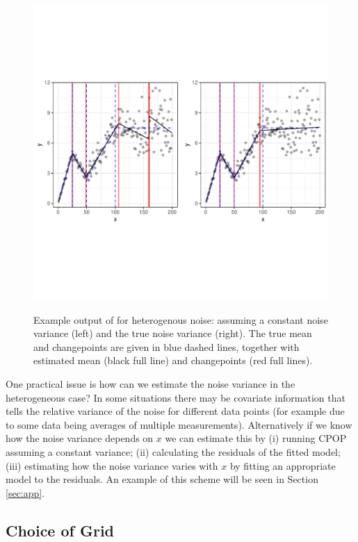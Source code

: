 \documentclass[nojss]{jss}
\begin{document}
\begin{figure}
\centering
{\includegraphics[scale=.5,width=14cm,trim={0 4cm 0 4cm},clip]{figures/cpop_uneven_examples_ggplot.pdf}}
\caption{Example output of  for heterogenous noise: assuming a constant noise variance (left) and the true noise variance (right). The true mean and changepoints are given in blue dashed lines, together with estimated mean (black full line) and changepoints (red full lines). }
\label{fig:cpop-example-heterogeneous}
\end{figure}

One practical issue is how can we estimate the noise variance in the heterogeneous case? In some situations there may be covariate information that tells the relative variance of the noise for different data points (for example due to some data being averages of multiple measurements). Alternatively if we know how the noise variance depends on $x$ we can estimate this by (i) running CPOP assuming a constant variance; (ii) calculating the residuals of the fitted model; (iii) estimating how the noise variance varies with $x$ by fitting an appropriate model to the residuals. An example of this scheme will be seen in Section \ref{sec:app}. 


\subsection{Choice of Grid}
\end{document}
